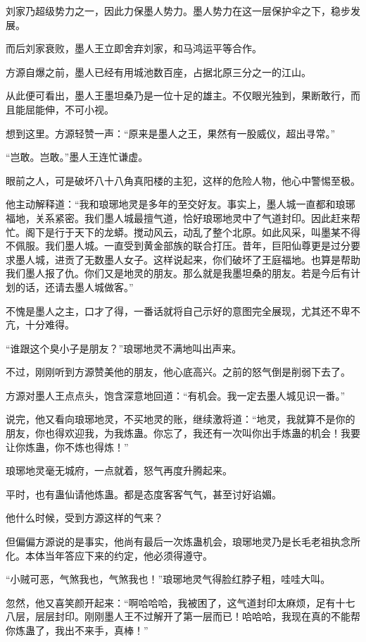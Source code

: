 \begin{this_body}
刘家乃超级势力之一，因此力保墨人势力。墨人势力在这一层保护伞之下，稳步发展。

而后刘家衰败，墨人王立即舍弃刘家，和马鸿运平等合作。

方源自爆之前，墨人已经有用城池数百座，占据北原三分之一的江山。

从此便可看出，墨人王墨坦桑乃是一位十足的雄主。不仅眼光独到，果断敢行，而且能屈能伸，不可小视。

想到这里。方源轻赞一声：“原来是墨人之王，果然有一股威仪，超出寻常。”

“岂敢。岂敢。”墨人王连忙谦虚。

眼前之人，可是破坏八十八角真阳楼的主犯，这样的危险人物，他心中警惕至极。

他主动解释道：“我和琅琊地灵是多年的至交好友。事实上，墨人城一直都和琅琊福地，关系紧密。我们墨人城最擅气道，恰好琅琊地灵中了气道封印。因此赶来帮忙。阁下是行于天下的龙蟒。搅动风云，动乱了整个北原。如此风采，叫墨某不得不佩服。我们墨人城。一直受到黄金部族的联合打压。昔年，巨阳仙尊更是过分要求墨人城，进贡了无数墨人女子。这样说起来，你们破坏了王庭福地。也算是帮助我们墨人报了仇。你们又是地灵的朋友。那么就是我墨坦桑的朋友。若是今后有计划的话，还请去墨人城做客。”

不愧是墨人之主，口才了得，一番话就将自己示好的意图完全展现，尤其还不卑不亢，十分难得。

“谁跟这个臭小子是朋友？”琅琊地灵不满地叫出声来。

不过，刚刚听到方源赞美他的朋友，他心底高兴。之前的怒气倒是削弱下去了。

方源对墨人王点点头，饱含深意地回道：“有机会。我一定去墨人城见识一番。”

说完，他又看向琅琊地灵，不买地灵的账，继续激将道：“地灵，我就算不是你的朋友，你也得欢迎我，为我炼蛊。你忘了，我还有一次叫你出手炼蛊的机会！我要让你炼蛊，你不炼也得炼！”

琅琊地灵毫无城府，一点就着，怒气再度升腾起来。

平时，也有蛊仙请他炼蛊。都是态度客客气气，甚至讨好谄媚。

他什么时候，受到方源这样的气来？

但偏偏方源说的是事实，他尚有最后一次炼蛊机会，琅琊地灵乃是长毛老祖执念所化。本体当年答应下来的约定，他必须得遵守。

“小贼可恶，气煞我也，气煞我也！”琅琊地灵气得脸红脖子粗，哇哇大叫。

忽然，他又喜笑颜开起来：“啊哈哈哈，我被困了，这气道封印太麻烦，足有十七八层，层层封印。刚刚墨人王不过解开了第一层而已！哈哈哈，我现在真的不能帮你炼蛊了，我出不来手，真棒！”


\end{this_body}
